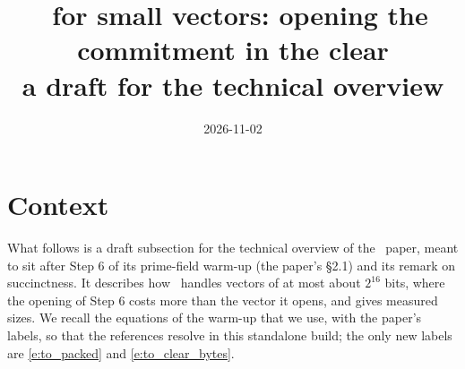 \documentclass[11pt,letterpaper,usenames,dvipsnames]{article}
\title{\ftwoz\ for small vectors: opening the commitment in the clear\\ \large a draft for the technical overview}
\author{}
\date{2026-11-02}
\begin{document}
\maketitle

\section{Context}\label{s:to_simple_bitz}

What follows is a draft subsection for the technical overview of the \ftwoz\ paper, meant to sit after Step 6 of its prime-field warm-up (the paper's \S2.1) and its remark on succinctness. It describes how \ftwoz\ handles vectors of at most about $2^{16}$ bits, where the opening of Step 6 costs more than the vector it opens, and gives measured sizes. We recall the equations of the warm-up that we use, with the paper's labels, so that the references resolve in this standalone build; the only new labels are \eqref{e:to_packed} and \eqref{e:to_clear_bytes}.
\end{document}
